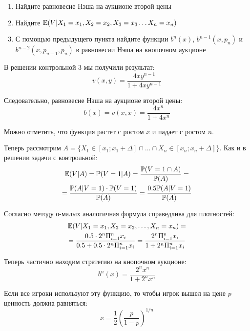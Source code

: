 \begin{enumerate}
\begin{enumerate}
\item Найдите равновесие Нэша на аукционе второй цены
\item Найдите $ \mathbb{E}(V|X_{1}=x_{1},X_{2}=x_{2},X_{3}=x_{3}\ldots X_{n}=x_{n}) $
\item С помощью предыдущего пункта найдите функции $ b^{n}(x) $,  $ b^{n-1}(x,p_{n}) $  и $ b^{n-2}(x,p_{n-1},p_{n}) $ в равновесии Нэша на кнопочном аукционе
\end{enumerate}


В решении контрольной 3 мы получили результат:
\begin{equation}
v(x,y)=\frac{4xy^{n-1}}{1+4xy^{n-1}}
\end{equation}

Следовательно, равновесие Нэша на аукционе второй цены:
\begin{equation}
b(x)=v(x,x)=\frac{4x^{n}}{1+4x^{n}}
\end{equation}

Можно отметить, что функция растет с ростом $ x $ и падает с ростом $ n $.

Теперь рассмотрим $ A=\{X_{1}\in[x_{1};x_{1}+\Delta] \cap \ldots  \cap X_{n}\in[x_{n};x_{n}+\Delta]\} $. Как и в решении задачи с контрольной:
\begin{multline}
\mathbb{E}(V|A)=\mathbb{P}(V=1|A)=\frac{\mathbb{P}(V=1 \cap A)}{\mathbb{P}(A)}=\\
=\frac{\mathbb{P}(A|V=1)\cdot \mathbb{P}(V=1)}{\mathbb{P}(A)}=\frac{0.5\mathbb{P}(A|V=1)}{\mathbb{P}(A)}
\end{multline}

Согласно методу о-малых аналогичная формула справедлива для плотностей:
\begin{multline}
\mathbb{E}(V|X_{1}=x_{1},X_{2}=x_{2},\ldots ,X_{n}=x_{n})=\\
=\frac{0.5\cdot 2^{n}\Pi_{i=1}^{n}x_{i}}{0.5+0.5\cdot 2^{n}\Pi_{i=1}^{n}x_{i}}
=\frac{2^{n}\Pi_{i=1}^{n}x_{i}}{1+ 2^{n}\Pi_{i=1}^{n}x_{i}}
\end{multline}

Теперь частично находим стратегию на кнопочном аукционе:
\begin{equation}
b^{n}(x)=\frac{2^{n}x^{n}}{1+2^{n}x^{n}}
\end{equation}

Если все игроки используют эту функцию, то чтобы игрок вышел на цене $ p $ ценность должна равняться:
\begin{equation}
x=\frac{1}{2}\left(\frac{p}{1-p} \right)^{1/n}
\end{equation}


\end{enumerate}
